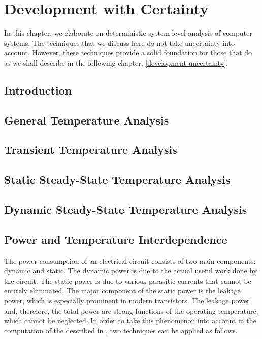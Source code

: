 \chapter{Development with Certainty}

In this chapter, we elaborate on deterministic system-level analysis of computer
systems. The techniques that we discuss here do not take uncertainty into
account. However, these techniques provide a solid foundation for those that do
as we shall describe in the following chapter, \cref{development-uncertainty}.

\section{Introduction}


\section{General Temperature Analysis}


\section{Transient Temperature Analysis}


\section{Static Steady-State Temperature Analysis}


\section{Dynamic Steady-State Temperature Analysis}


\section{Power and Temperature Interdependence}

The power consumption of an electrical circuit consists of two main components:
dynamic and static. The dynamic power is due to the actual useful work done by
the circuit. The static power is due to various parasitic currents that cannot
be entirely eliminated. The major component of the static power is the leakage
power, which is especially prominent in modern  transistors. The
leakage power and, therefore, the total power are strong functions of the
operating temperature, which cannot be neglected. In order to take this
phenomenon into account in the computation of the  described in
, two techniques can be applied as follows.


